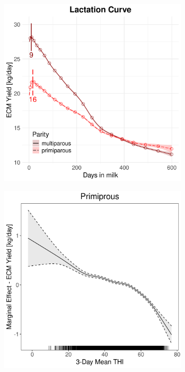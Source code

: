 \begin{figure}[H]
\begin{subfigure}[b]{0.45\textwidth}
        \includegraphics[width=\textwidth]{thesis/figures/models/ecm/after2010/ob_ecm_after2010/ob_ecm_after2010_marginal_dim_milk_combined.png}
    \end{subfigure}
    \begin{subfigure}[b]{0.45\textwidth}
        \centering
        \includegraphics[width=\textwidth]{thesis/figures/models/ecm/after2010/ob_ecm_after2010/ob_ecm_after2010_marginal_thi_milk_primi.png}

\end{subfigure}
\end{figure}
